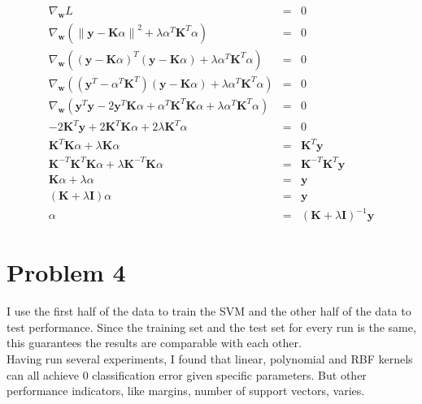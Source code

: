 \documentclass[12pt]{article}
\begin{document}
\begin{eqnarray*}
  \nabla_{\textbf{w}} {L}
  &=& 0 \\
  \nabla_{\textbf{w}} {\left( 
      \left\lVert \textbf{y} - \textbf{K} \alpha \right\rVert^2 
      + \lambda \alpha^T \textbf{K}^T \alpha \right)}
  &=& 0 \\
  \nabla_{\textbf{w}} {\left( \left(\textbf{y} - \textbf{K} \alpha \right)^T
      \left(\textbf{y} - \textbf{K} \alpha \right)
      + \lambda \alpha^T \textbf{K}^T \alpha \right)}
  &=& 0 \\
  \nabla_{\textbf{w}} {\left( 
      \left(\textbf{y}^T - \alpha^T \textbf{K}^T \right)
      \left(\textbf{y} - \textbf{K} \alpha \right) 
      + \lambda \alpha^T \textbf{K}^T \alpha \right)}
  &=& 0 \\
  \nabla_{\textbf{w}} {\left( 
      \textbf{y}^T \textbf{y} - 2 \textbf{y}^T \textbf{K} \alpha
      + \alpha^T \textbf{K}^T \textbf{K} \alpha 
      + \lambda \alpha^T \textbf{K}^T \alpha \right)}
  &=& 0 \\
  - 2 \textbf{K}^T \textbf{y} + 2 \textbf{K}^T \textbf{K} \alpha 
  + 2 \lambda \textbf{K}^T \alpha
  &=& 0 \\
  \textbf{K}^T \textbf{K} \alpha + \lambda \textbf{K} \alpha
  &=& \textbf{K}^T \textbf{y} \\
  \textbf{K}^{-T} \textbf{K}^T \textbf{K} \alpha
  + \lambda \textbf{K}^{-T} \textbf{K} \alpha
  &=& \textbf{K}^{-T} \textbf{K}^T \textbf{y} \\
  \textbf{K} \alpha + \lambda \alpha
  &=& \textbf{y} \\
  \left( \textbf{K} + \lambda \textbf{I} \right) \alpha
  &=& \textbf{y} \\
  \alpha &=& \left( \textbf{K} + \lambda \textbf{I} \right)^{-1} \textbf{y}
\end{eqnarray*}

\section*{Problem 4}

I use the first half of the data to train the SVM and the other half of the data to test performance. Since the training set and the test set for every run is the same, this guarantees the results are comparable with each other. \\

Having run several experiments, I found that linear, polynomial and RBF kernels can all achieve 0 classification error given specific parameters. But other performance indicators, like margins, number of support vectors, varies. \\
\end{document}
